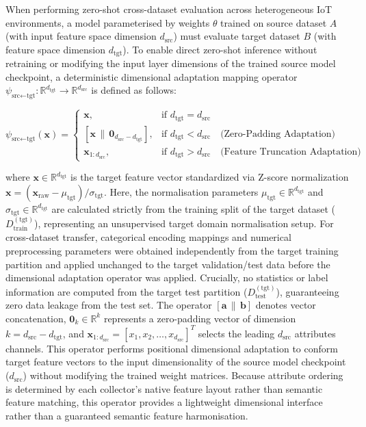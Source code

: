 \documentclass[a4paper,fleqn]{cas-sc}
\begin{document}
When performing zero-shot cross-dataset evaluation across heterogeneous IoT environments, a model parameterised by weights $\theta$ trained on source dataset $A$ (with input feature space dimension $d_{\text{src}}$) must evaluate target dataset $B$ (with feature space dimension $d_{\text{tgt}}$). To enable direct zero-shot inference without retraining or modifying the input layer dimensions of the trained source model checkpoint, a deterministic dimensional adaptation mapping operator $\psi_{\text{src} \leftarrow \text{tgt}}: \mathbb{R}^{d_{\text{tgt}}} \rightarrow \mathbb{R}^{d_{\text{src}}}$ is defined as follows:

\begin{equation}
\psi_{\text{src} \leftarrow \text{tgt}}(\mathbf{x}) = 
\begin{cases}
\mathbf{x}, & \text{if } d_{\text{tgt}} = d_{\text{src}} \\[1.5ex]
\left[ \mathbf{x} \,\|\, \mathbf{0}_{d_{\text{src}} - d_{\text{tgt}}} \right], & \text{if } d_{\text{tgt}} < d_{\text{src}} \quad \text{(Zero-Padding Adaptation)} \\[1.5ex]
\mathbf{x}_{1:d_{\text{src}}}, & \text{if } d_{\text{tgt}} > d_{\text{src}} \quad \text{(Feature Truncation Adaptation)}
\end{cases}
\label{eq:cross_dataset_alignment}
\end{equation}

where $\mathbf{x} \in \mathbb{R}^{d_{\text{tgt}}}$ is the target feature vector standardized via Z-score normalization $\mathbf{x} = (\mathbf{x}_{\text{raw}} - \mu_{\text{tgt}}) / \sigma_{\text{tgt}}$. Here, the normalisation parameters $\mu_{\text{tgt}} \in \mathbb{R}^{d_{\text{tgt}}}$ and $\sigma_{\text{tgt}} \in \mathbb{R}^{d_{\text{tgt}}}$ are calculated strictly from the training split of the target dataset ($D_{\text{train}}^{(\text{tgt})}$), representing an unsupervised target domain normalisation setup. {\color{blue}For cross-dataset transfer, categorical encoding mappings and numerical preprocessing parameters were obtained independently from the target training partition and applied unchanged to the target validation/test data before the dimensional adaptation operator was applied.} Crucially, no statistics or label information are computed from the target test partition ($D_{\text{test}}^{(\text{tgt})}$), guaranteeing zero data leakage from the test set. The operator $[\mathbf{a} \,\|\, \mathbf{b}]$ denotes vector concatenation, $\mathbf{0}_{k} \in \mathbb{R}^k$ represents a zero-padding vector of dimension $k = d_{\text{src}} - d_{\text{tgt}}$, and $\mathbf{x}_{1:d_{\text{src}}} = [x_1, x_2, \dots, x_{d_{\text{src}}}]^T$ selects the leading $d_{\text{src}}$ attributes channels. This operator performs positional dimensional adaptation to conform target feature vectors to the input dimensionality of the source model checkpoint ($d_{\text{src}}$) without modifying the trained weight matrices. Because attribute ordering is determined by each collector's native feature layout rather than semantic feature matching, this operator provides a lightweight dimensional interface rather than a guaranteed semantic feature harmonisation.
\end{document}
